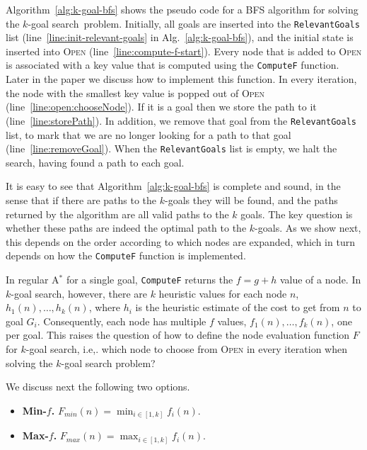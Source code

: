 \documentclass{aicom2e}
\newcommand{\kgs}{$k$-goal search}
\newcommand{\astar}{A$^*$}
\newcommand{\open}{\textsc{Open}}
\begin{document}
Algorithm~\ref{alg:k-goal-bfs} shows the pseudo code for a BFS algorithm for solving the \kgs\ problem. 
Initially, all goals are inserted into the {\tt RelevantGoals} list (line~\ref{line:init-relevant-goals} in Alg.~\ref{alg:k-goal-bfs}), 
and the initial state is inserted into \open{} (line~\ref{line:compute-f-start}). 
Every node that is added to \open{} is associated with a key value 
that is computed using the {\tt ComputeF} function.  
Later in the paper we discuss how to implement this function. 
In every iteration, the node with the smallest key value is popped out of \open{} (line~\ref{line:open:chooseNode}). 
If it is a goal then we store the path to it (line~\ref{line:storePath}). In addition, we remove that goal from
the {\tt RelevantGoals} list, to mark that we are no longer looking for a path to that goal (line~\ref{line:removeGoal}). 
When the {\tt RelevantGoals} list is empty, we halt the search, having found a path to each goal. 


It is easy to see that Algorithm~\ref{alg:k-goal-bfs} is complete and sound, in the sense that if there are paths to the $k$-goals they will be found,
and the paths returned by the algorithm are all valid paths to the $k$ goals. The key question is whether these paths are indeed the optimal path to the $k$-goals.
As we show next, this depends on the order according to which nodes are expanded, 
which in turn depends on how the {\tt ComputeF} function is implemented. 

In regular \astar{} for a single goal, {\tt ComputeF} returns the $f=g+h$ value of a node. 
In \kgs{}, however, there are $k$ heuristic values for each node $n$, $h_1(n),\ldots,h_k(n)$,  where $h_i$ is the heuristic estimate of the cost to get from $n$ to goal $G_i$.  
Consequently, each node has multiple  $f$ values, $f_1(n),\ldots,f_k(n)$, one per goal. 
This raises the question of how to define the node evaluation function $F$ for \kgs{}, 
i.e,. which node to choose from \open{} in every iteration when solving the \kgs{} problem?


We discuss next the following two options. 
\begin{itemize}
 \item {\bf Min-$f$.} $F_{min}(n)=\min_{i\in [1,k]}f_i(n)$. 
 \item {\bf Max-$f$.} $F_{max}(n)=\max_{i\in [1,k]}f_i(n)$. 
\end{itemize}
\end{document}
